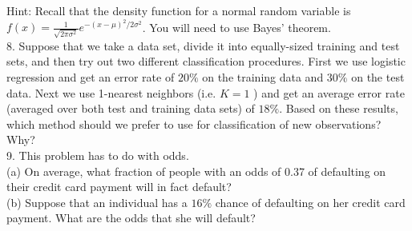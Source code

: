\documentclass[10pt]{article}
\begin{document}
Hint: Recall that the density function for a normal random variable is $f(x)=\frac{1}{\sqrt{2 \pi \sigma^{2}}} e^{-(x-\mu)^{2} / 2 \sigma^{2}}$. You will need to use Bayes' theorem.\\
8. Suppose that we take a data set, divide it into equally-sized training and test sets, and then try out two different classification procedures. First we use logistic regression and get an error rate of $20 \%$ on the training data and $30 \%$ on the test data. Next we use 1-nearest neighbors (i.e. $K=1$ ) and get an average error rate (averaged over both test and training data sets) of $18 \%$. Based on these results, which method should we prefer to use for classification of new observations? Why?\\
9. This problem has to do with odds.\\
(a) On average, what fraction of people with an odds of 0.37 of defaulting on their credit card payment will in fact default?\\
(b) Suppose that an individual has a $16 \%$ chance of defaulting on her credit card payment. What are the odds that she will default?
\end{document}
